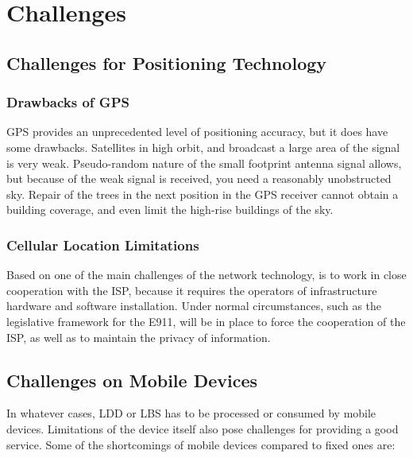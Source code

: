 \documentclass[12pt,a4paper,titlepage]{article}
\begin{document}
\section{Challenges} %
\label{sec:challenges}

\subsection{Challenges for Positioning Technology} %
\label{sub:challenges_for_positioning_technology}

\subsubsection{Drawbacks of GPS} %
\label{ssub:drawbacks_of_gps}
GPS provides an unprecedented level of positioning accuracy, but it does have some drawbacks. Satellites in high orbit, and broadcast a large area of ​​the signal is very weak. Pseudo-random nature of the small footprint antenna signal allows, but because of the weak signal is received, you need a reasonably unobstructed sky. Repair of the trees in the next position in the GPS receiver cannot obtain a building coverage, and even limit the high-rise buildings of the sky. \cite{DRoza:2003wz}

\subsubsection{Cellular Location Limitations} %
\label{ssub:cellular_location_limitations}
Based on one of the main challenges of the network technology, is to work in close cooperation with the ISP, because it requires the operators of infrastructure hardware and software installation. Under normal circumstances, such as the legislative framework for the E911, will be in place to force the cooperation of the ISP, as well as to maintain the privacy of information. \cite{wiki-cellloc}


\subsection{Challenges on Mobile Devices} %
\label{sub:challenges_on_mobile_devices}
In whatever cases, LDD or LBS has to be processed or consumed by mobile devices. Limitations of the device itself also pose challenges for providing a good service. Some of the shortcomings of mobile devices compared to fixed ones are:
\end{document}
